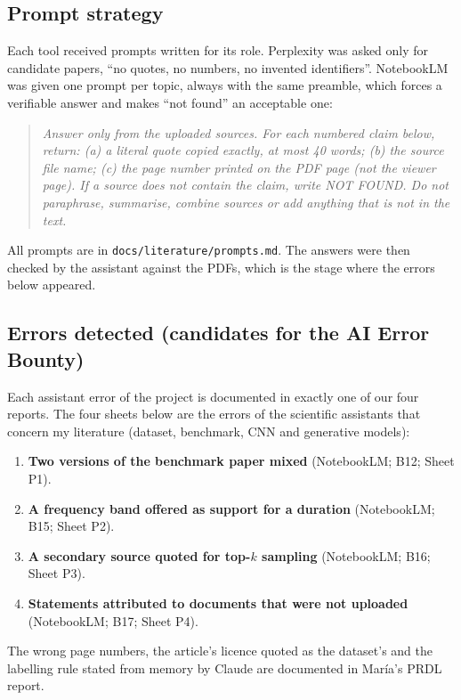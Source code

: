 \subsection*{Prompt strategy}

Each tool received prompts written for its role. Perplexity was asked only for candidate papers, ``no
quotes, no numbers, no invented identifiers''. NotebookLM was given one prompt per topic, always with the
same preamble, which forces a verifiable answer and makes ``not found'' an acceptable one:
\begin{quote}\small\itshape
Answer only from the uploaded sources. For each numbered claim below, return: (a) a literal quote copied
exactly, at most 40 words; (b) the source file name; (c) the page number printed on the PDF page (not the
viewer page). If a source does not contain the claim, write NOT FOUND. Do not paraphrase, summarise,
combine sources or add anything that is not in the text.
\end{quote}
All prompts are in \texttt{docs/literature/prompts.md}. The answers were then checked by the assistant
against the PDFs, which is the stage where the errors below appeared.

\subsection*{Errors detected (candidates for the AI Error Bounty)}

Each assistant error of the project is documented in exactly one of our four reports. The four sheets
below are the errors of the scientific assistants that concern my literature (dataset, benchmark, CNN and
generative models):
\begin{enumerate}[leftmargin=1.4em,itemsep=1pt]
  \item \textbf{Two versions of the benchmark paper mixed} (NotebookLM; B12; Sheet P1).
  \item \textbf{A frequency band offered as support for a duration} (NotebookLM; B15; Sheet P2).
  \item \textbf{A secondary source quoted for top-$k$ sampling} (NotebookLM; B16; Sheet P3).
  \item \textbf{Statements attributed to documents that were not uploaded} (NotebookLM; B17; Sheet P4).
\end{enumerate}
The wrong page numbers, the article's licence quoted as the dataset's and the labelling rule stated from
memory by Claude are documented in Mar\'ia's PRDL report.

